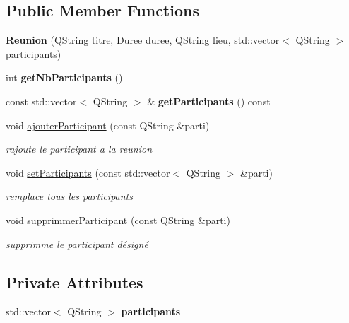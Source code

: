 \subsection*{Public Member Functions}
\begin{DoxyCompactItemize}
\item 
\hypertarget{class_reunion_a61af96d205195878e6ff2591907277c2}{}{\bfseries Reunion} (Q\+String titre, \hyperlink{class_duree}{Duree} duree, Q\+String lieu, std\+::vector$<$ Q\+String $>$ participants)\label{class_reunion_a61af96d205195878e6ff2591907277c2}

\item 
\hypertarget{class_reunion_a0b3ed32080ea2aa1f35ace3de8782f65}{}int {\bfseries get\+Nb\+Participants} ()\label{class_reunion_a0b3ed32080ea2aa1f35ace3de8782f65}

\item 
\hypertarget{class_reunion_ae4d5f04c6bb8c6e3aaa561ff40c86bb3}{}const std\+::vector$<$ Q\+String $>$ \& {\bfseries get\+Participants} () const \label{class_reunion_ae4d5f04c6bb8c6e3aaa561ff40c86bb3}

\item 
void \hyperlink{class_reunion_ac7af0e1d56757f6f0f55bf9526d4b45b}{ajouter\+Participant} (const Q\+String \&parti)
\begin{DoxyCompactList}\small\item\em rajoute le participant a la reunion \end{DoxyCompactList}\item 
void \hyperlink{class_reunion_a08293ef8675efe4035fca87fe2c4e6cb}{set\+Participants} (const std\+::vector$<$ Q\+String $>$ \&parti)
\begin{DoxyCompactList}\small\item\em remplace tous les participants \end{DoxyCompactList}\item 
void \hyperlink{class_reunion_a1b27209e80dd8a68fb87daa9526ebcaf}{supprimmer\+Participant} (const Q\+String \&parti)
\begin{DoxyCompactList}\small\item\em supprimme le participant désigné \end{DoxyCompactList}\end{DoxyCompactItemize}
\subsection*{Private Attributes}
\begin{DoxyCompactItemize}
\item 
\hypertarget{class_reunion_ad8ea8eb1f8f5e2edee4c12114e8b463d}{}std\+::vector$<$ Q\+String $>$ {\bfseries participants}\label{class_reunion_ad8ea8eb1f8f5e2edee4c12114e8b463d}

\end{DoxyCompactItemize}
